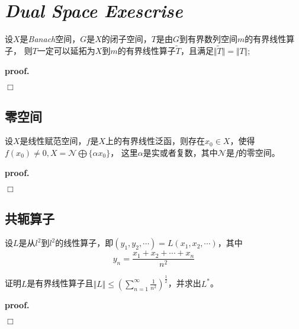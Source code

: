 \chapter{\textsl{Dual Space Exescrise}}

\begin{mdframed}
    \begin{question}
        设$X$是\textsl{Banach}空间，$G$是$X$的闭子空间，$T$是由$G$到有界数列空间$m$的有界线性算子，
        则$T$一定可以延拓为$X$到$m$的有界线性算子$\widetilde{T}$，且满足$\Vert \widetilde{T}\Vert=\Vert T\Vert$;
    \end{question}
\end{mdframed}

\textbf{proof. }

$\Box$

\section{零空间}

\begin{mdframed}
    \begin{question}
        设$X$是线性赋范空间，$f$是$X$上的有界线性泛函，则存在$x_0\in X$，使得$f(x_0)\neq 0,X=\mathcal{N}\bigoplus \{\alpha x_0\}$，
        这里$\alpha$是实或者复数，其中$\mathcal{N}$是$f$的零空间。
    \end{question}
\end{mdframed}

\textbf{proof. }

$\Box$

\section{共轭算子}

\begin{mdframed}
    \begin{question}
        设$L$是从$l^2$到$l^2$的线性算子，即$(y_1,y_2,\cdots)=L(x_1,x_2,\cdots)$，其中
        \begin{equation}
            y_n=\frac{x_1+x_2+\cdots+x_n}{n^2}
        \end{equation}

        证明$L$是有界线性算子且$\Vert L\Vert\leqslant (\sum_{n=1}^{\infty}\frac{1}{n^2})^\frac{1}{2}$，并求出$L^*$。
    \end{question}
\end{mdframed}

\textbf{proof. }

$\Box$

